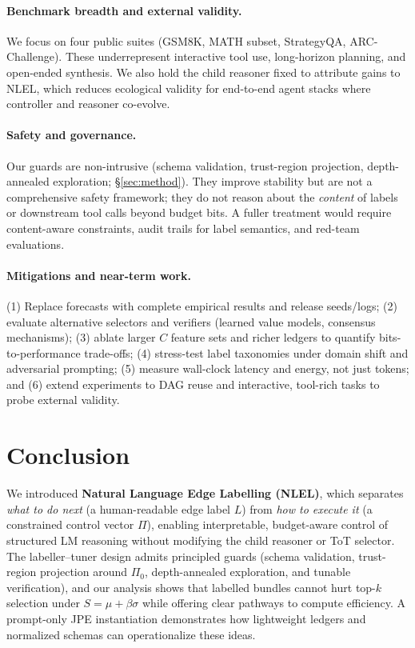 \documentclass{article}
\theoremstyle{plain}
\theoremstyle{definition}
\theoremstyle{remark}
\begin{document}
\paragraph{Benchmark breadth and external validity.}
We focus on four public suites (GSM8K, MATH subset, StrategyQA, ARC-Challenge). These underrepresent interactive tool use, long-horizon planning, and open-ended synthesis. We also hold the child reasoner fixed to attribute gains to NLEL, which reduces ecological validity for end-to-end agent stacks where controller and reasoner co-evolve.

\paragraph{Safety and governance.}
Our guards are non-intrusive (schema validation, trust-region projection, depth-annealed exploration; \S\ref{sec:method}). They improve stability but are not a comprehensive safety framework; they do not reason about the \emph{content} of labels or downstream tool calls beyond budget bits. A fuller treatment would require content-aware constraints, audit trails for label semantics, and red-team evaluations.

\paragraph{Mitigations and near-term work.}
(1) Replace forecasts with complete empirical results and release seeds/logs;
(2) evaluate alternative selectors and verifiers (learned value models, consensus mechanisms);
(3) ablate larger $C$ feature sets and richer ledgers to quantify bits-to-performance trade-offs;
(4) stress-test label taxonomies under domain shift and adversarial prompting;
(5) measure wall-clock latency and energy, not just tokens; and
(6) extend experiments to DAG reuse and interactive, tool-rich tasks to probe external validity.
\section{Conclusion}

We introduced \textbf{Natural Language Edge Labelling (NLEL)}, which separates \emph{what to do next} (a human-readable edge label \(L\)) from \emph{how to execute it} (a constrained control vector \(\Pi\)), enabling interpretable, budget-aware control of structured LM reasoning without modifying the child reasoner or ToT selector. The labeller--tuner design admits principled guards (schema validation, trust-region projection around \(\Pi_{0}\), depth-annealed exploration, and tunable verification), and our analysis shows that labelled bundles cannot hurt top-\(k\) selection under \(S=\mu+\beta\sigma\) while offering clear pathways to compute efficiency. A prompt-only JPE instantiation demonstrates how lightweight ledgers and normalized schemas can operationalize these ideas.
\end{document}
